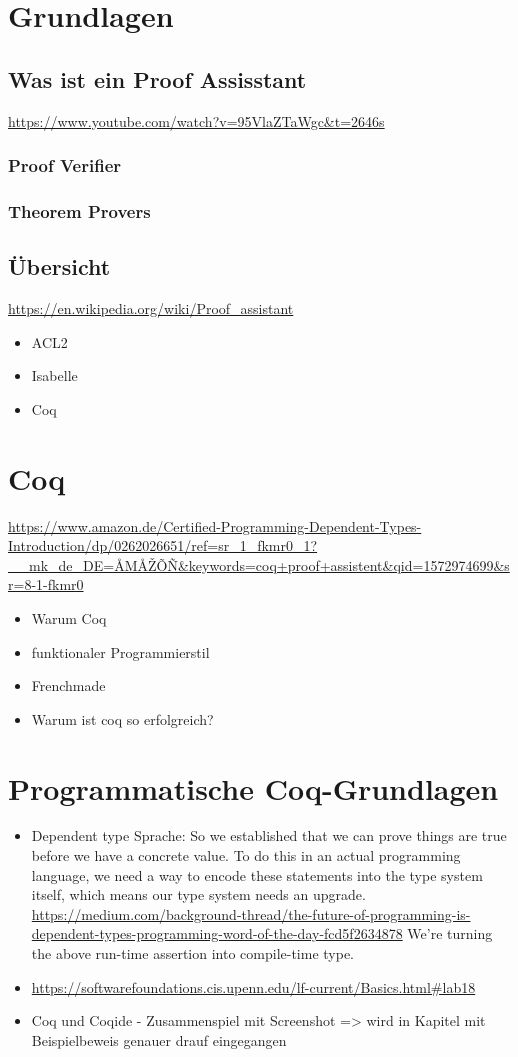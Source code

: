 \section{Grundlagen}
\subsection{Was ist ein Proof Assisstant}
\url{https://www.youtube.com/watch?v=95VlaZTaWgc&t=2646s}


\subsubsection{Proof Verifier}
\subsubsection{Theorem Provers}

\subsection{Übersicht}
\url{https://en.wikipedia.org/wiki/Proof_assistant}
\begin{itemize}
	\item ACL2
	\item Isabelle
	\item Coq
\end{itemize}

\section{Coq}
\url{https://www.amazon.de/Certified-Programming-Dependent-Types-Introduction/dp/0262026651/ref=sr_1_fkmr0_1?__mk_de_DE=ÅMÅŽÕÑ&keywords=coq+proof+assistent&qid=1572974699&sr=8-1-fkmr0}
\begin{itemize}
	\item Warum Coq
	\item funktionaler Programmierstil
	\item Frenchmade
	\item Warum ist coq so erfolgreich?
\end{itemize}

\section{Programmatische Coq-Grundlagen}
\begin{itemize}
	\item Dependent type Sprache: So we established that we can prove things are true before we have a concrete value. To do this in an actual programming language, we need a way to encode these statements into the type system itself, which means our type system needs an upgrade. \url{https://medium.com/background-thread/the-future-of-programming-is-dependent-types-programming-word-of-the-day-fcd5f2634878}
	We're turning the above run-time assertion into compile-time type.
	\item \url{https://softwarefoundations.cis.upenn.edu/lf-current/Basics.html#lab18}
	\item Coq und Coqide - Zusammenspiel mit Screenshot => wird in Kapitel mit Beispielbeweis genauer drauf eingegangen
\end{itemize}
